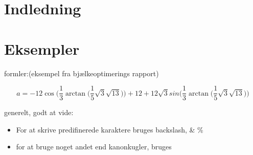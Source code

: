 \documentclass[titlepage]{article}
\begin{document}
\begin{abstract}

\end{abstract}


%
%

\tableofcontents
\listoffigures
\listoftables

\newpage

%
%

\section{Indledning}

\section{Eksempler}

formler:(eksempel fra bjælkeoptimerings rapport)

$$a=-12\cos\bigg(\frac{1}{3}\arctan\bigg(\frac{1}{5}\sqrt{3}\sqrt{13}\bigg)\bigg)+12+12\sqrt{3}sin\bigg(\frac{1}{3}\arctan\bigg(\frac{1}{5}\sqrt{3}\sqrt{13}\bigg)\bigg)$$

generelt, godt at vide:

\begin{itemize}
    \item For at skrive predifinerede karaktere bruges backslash, \& \%
    \item for at bruge noget andet end kanonkugler, bruges 
\end{itemize}

\newpage




\end{document}
